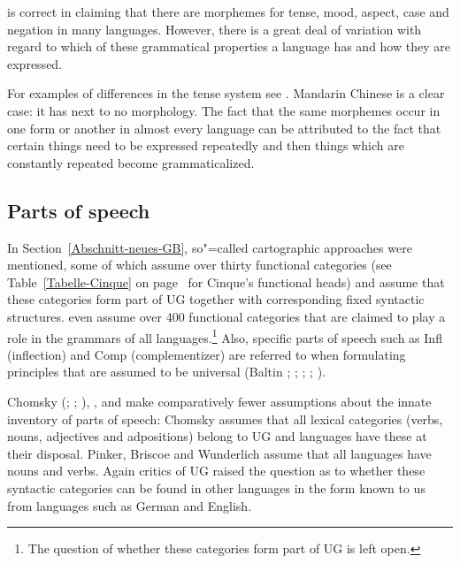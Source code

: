 \citet[]{Pinker94a} is correct in claiming that there are morphemes for tense, mood, aspect, case and negation in many languages. However, there is a great
deal of variation with regard to which of these grammatical properties a language has and
how they are expressed.

For examples of differences in the tense system see . Mandarin
Chinese is a clear case: it has next to no morphology. The fact that the same morphemes occur in one form or another in almost every language
can be attributed to the fact that certain things need to be expressed repeatedly and then things which are constantly repeated become grammaticalized.


\subsection{Parts of speech}
\label{Abschnitt-UG-Wortarten}

In Section~\ref{Abschnitt-neues-GB}, so"=called cartographic approaches were mentioned, some of which assume over thirty functional categories
(see Table~\ref{Tabelle-Cinque} on page~\pageref{Tabelle-Cinque} for Cinque's functional heads) and assume that these categories form part of UG together with corresponding fixed syntactic structures.
\citet[, 57]{CR2010a} even assume over 400 functional categories
that are claimed to play a role in the grammars of all languages.\footnote{%
	The question of whether these categories form part of UG is left open.
}
Also, specific parts of speech such as \mbox{Infl} (inflection) and
Comp (complementizer) are referred to when formulating principles that are assumed to be universal (Baltin \citeyear[]{Baltin81a}; \citeyear{Baltin2006a}; \citealp{Rizzi82b}; \citealp[]{Chomsky86b};
\citealp[]{Hornstein2013a}). 

Chomsky (\citeyear[]{Chomsky88a-u}; \citeyear{Chomsky91a-u};
\citeyear[]{Chomsky95a-u}), \citet[, 286]{Pinker94a}, \citet[]{Briscoe2000a} and
\citet[]{Wunderlich2004a} make comparatively fewer assumptions about the innate inventory of parts of speech:
Chomsky assumes that all lexical categories (verbs,  nouns,
adjectives and adpositions) belong to UG and languages have these at their disposal.
Pinker, Briscoe and Wunderlich assume that all languages have nouns and verbs.
Again critics of UG raised the question as to whether these syntactic categories can be found in other languages in the form known to us from languages such as German and English.

